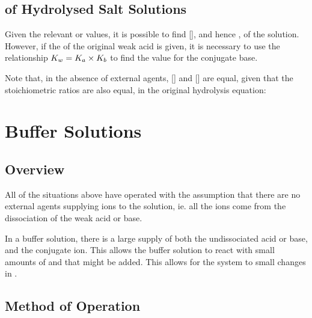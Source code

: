 		\subsection{\texorpdfstring{\pH{}}{pH} of Hydrolysed Salt Solutions}

			Given the relevant \Ka{} or \Kb{} values, it is possible to find [], and hence \pH{}, of the solution. However,
			if the \Ka{} of the original weak acid is given, it is necessary to use the relationship $K_{w} = K_{a} \times K_{b}$ to find
			the \Kb{} value for the conjugate base.

			\mathdiagram{
				\[ \MKb = \frac{\MKw}{\MKa}  \hspace{15mm}  \MKb = \frac{[\ch{CH3CO2H}][\ch{OH-}]}{[\ch{CH3CO2-}]} \]
			}
			Note that, in the absence of external agents, [] and [] are equal, given that the stoichiometric ratios
			are also equal, in the original hydrolysis equation:





	\section{Buffer Solutions}

		\subsection{Overview}

			All of the situations above have operated with the assumption that there are no external agents supplying ions to the solution,
			ie. all the ions come from the dissociation of the weak acid or base.

			In a buffer solution, there is a large supply of both the undissociated acid or base, and the conjugate ion. This allows the
			buffer solution to react with small amounts of   and  that might be added. This allows for the system
			to  small changes in \pH{}.



		\subsection{Method of Operation}

